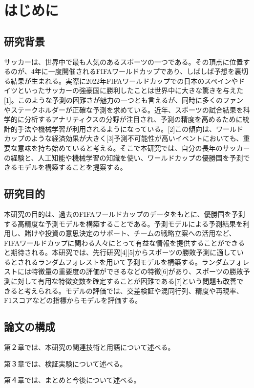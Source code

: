 \documentclass[platex]{suribt}
\begin{document}
\tableofcontents%

\mainmatter%
\chapter{はじめに}
\section{研究背景}
サッカーは、世界中で最も人気のあるスポーツの一つである。その頂点に位置するのが、4年に一度開催されるFIFAワールドカップであり、しばしば予想を裏切る結果が生まれる。実際に2022年FIFAワールドカップでの日本のスペインやドイツといったサッカーの強豪国に勝利したことは世界中に大きな驚きを与えた[1]。このような予測の困難さが魅力の一つとも言えるが、同時に多くのファンやステークホルダーが正確な予測を求めている。近年、スポーツの試合結果を科学的に分析するアナリティクスの分野が注目され、予測の精度を高めるために統計的手法や機械学習が利用されるようになっている。[2]この傾向は、ワールドカップのような経済効果が大きく[3]予測不可能性が高いイベントにおいても、重要な意味を持ち始めていると考える。そこで本研究では、自分の長年のサッカーの経験と、人工知能や機械学習の知識を使い、ワールドカップの優勝国を予測できるモデルを構築することを提案する。
\section{研究目的}
本研究の目的は、過去のFIFAワールドカップのデータをもとに、優勝国を予測する高精度な予測モデルを構築することである。予測モデルによる予測結果を利用し、賭けや投資の意思決定のサポート、チームの戦略立案への活用など、FIFAワールドカップに関わる人々にとって有益な情報を提供することができると期待される。本研究では、先行研究[4][5]からスポーツの勝敗予測に適しているとされるランダムフォレストを用いて予測モデルを構築する。ランダムフォレストには特徴量の重要度の評価ができるなどの特徴[6]があり、スポーツの勝敗予測に対して有用な特徴変数を確定することが困難である[7]という問題も改善できると考えられる。モデルの評価では、交差検証や混同行列、精度や再現率、F1スコアなどの指標からモデルを評価する。
\section{論文の構成}
第２章では、本研究の関連技術と用語について述べる。\par
第３章では、検証実験について述べる。\par
第４章では、まとめと今後について述べる。
\end{document}
